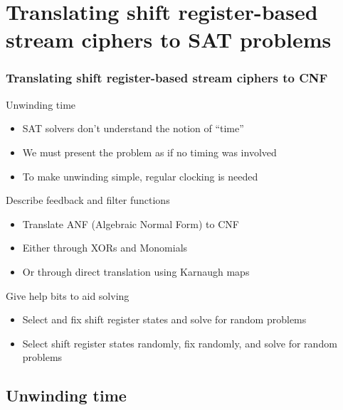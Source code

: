 \documentclass[xcolor=usenames,xcolor=svgnames,table,slidestop,compress,mathserif]{beamer}
\begin{document}
\section{Translating shift register-based stream ciphers to SAT problems}

\frame
{\frametitle{Translating shift register-based stream ciphers to CNF}
\begin{beamerboxesrounded}[shadow=true]{Unwinding time}
\begin{itemize}
 \item SAT solvers don't understand the notion of ``time''
 \item We must present the problem as if no timing was involved
 \item To make unwinding simple, regular clocking is needed
\end{itemize}
\end{beamerboxesrounded}

\smallskip

\begin{beamerboxesrounded}[shadow=true]{Describe feedback and filter functions}
\begin{itemize}
 \item Translate ANF (Algebraic Normal Form) to CNF
 \item Either through XORs and Monomials
 \item Or through direct translation using Karnaugh maps
\end{itemize}
\end{beamerboxesrounded}

\smallskip

\begin{beamerboxesrounded}[shadow=true]{Give help bits to aid solving}
\begin{itemize}
 \item Select and fix shift register states and solve for random problems
 \item Select shift register states randomly, fix randomly, and solve for random problems
\end{itemize}
\end{beamerboxesrounded}
}

\subsection{Unwinding time}
\end{document}
